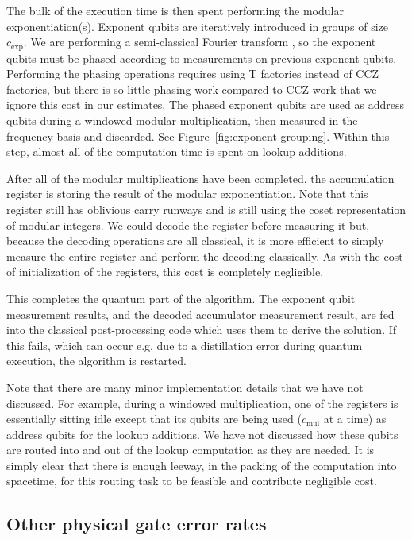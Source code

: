 \documentclass[superscriptaddress,notitlepage,longbibliography]{revtex4-1}
\theoremstyle{definition}
\theoremstyle{definition}
\newcommand{\fig}[1]{\hyperref[fig:#1]{Figure~\ref*{fig:#1}}}
\newcommand{\gexp}{{c_{\text{exp}}}}
\newcommand{\gmul}{{c_{\text{mul}}}}
\begin{document}
The bulk of the execution time is then spent performing the modular exponentiation(s).
Exponent qubits are iteratively introduced in groups of size $\gexp$.
We are performing a semi-classical Fourier transform \cite{griffiths1996semiclassical}, so the exponent qubits must be phased according to measurements on previous exponent qubits.
Performing the phasing operations requires using T factories instead of CCZ factories, but there is so little phasing work compared to CCZ work that we ignore this cost in our estimates.
The phased exponent qubits are used as address qubits during a windowed modular multiplication, then measured in the frequency basis and discarded.
See \fig{exponent-grouping}.
Within this step, almost all of the computation time is spent on lookup additions.

After all of the modular multiplications have been completed, the accumulation register is storing the result of the modular exponentiation.
Note that this register still has oblivious carry runways and is still using the coset representation of modular integers.
We could decode the register before measuring it but, because the decoding operations are all classical, it is more efficient to simply measure the entire register and perform the decoding classically.
As with the cost of initialization of the registers, this cost is completely negligible.

This completes the quantum part of the algorithm.
The exponent qubit measurement results, and the decoded accumulator measurement result, are fed into the classical post-processing code which uses them to derive the solution.
If this fails, which can occur e.g. due to a distillation error during quantum execution, the algorithm is restarted.

Note that there are many minor implementation details that we have not discussed.
For example, during a windowed multiplication, one of the registers is essentially sitting idle except that its qubits are being used ($\gmul$ at a time) as address qubits for the lookup additions.
We have not discussed how these qubits are routed into and out of the lookup computation as they are needed.
It is simply clear that there is enough leeway, in the packing of the computation into spacetime, for this routing task to be feasible and contribute negligible cost.


\subsection{Other physical gate error rates}
\end{document}
